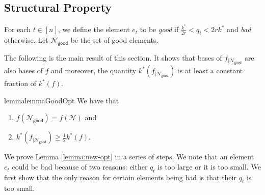 \documentclass[11pt]{article}
\theoremstyle{definition}
\newcommand{\calN}{{\mathcal{N}}}
\newcommand{\good}{\mathsf{good}}
\begin{document}
\subsection{Structural Property}\label{subsection:structural-property}
For each $t \in [n]$, we define the element $e_t$ to be \emph{good} if $\frac{k^*}{2r}< q_t < 2rk^*$ and \emph{bad} otherwise. Let $\mathcal{N}_{\good}$ be the set of good elements. 
\iffalse
We define the following counterpart of $k^*$. 
\begin{equation}
    k^*_{\text{onl}}:=\min_{A\subseteq \mathcal{N}_{\good}: f(A)<f(\mathcal{N}_{\good})} \frac{\sum_{e\in \mathcal{N}_{\good}}f_A(e)}{f(\mathcal{N}_{\good})-f(A)}. \label{def:new-opt-k}
\end{equation}
\fi
The following is the main result of this section. It shows that bases of $f_{|\calN_{\good}}$ are also bases of $f$ and moreover, the quantity $k^*(f_{|\calN_{\good}})$ is at least a constant fraction of $k^*(f)$. 
\begin{restatable}{lemma}{lemmaGoodOpt}\label{lemma:new-opt}
We have that 
\begin{enumerate}
    \item $f(\calN_{\good})=f(\calN)$ and 
    \item $k^*(f_{|\calN_{\good}})\ge \frac{1}{2} k^*(f)$. 
\end{enumerate}
\end{restatable}
We prove Lemma \ref{lemma:new-opt} in a series of steps. 
We note that an element $e_t$ could be bad because of two reasons: either $q_t$ is too large or it is too small. 
We first show that the only reason for certain elements being bad is that their $q_t$ is too small. 
\end{document}
